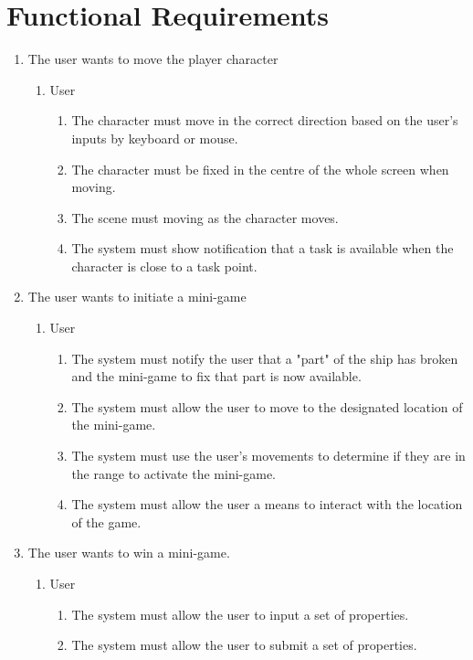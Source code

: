 \documentclass[]{article}
\begin{document}
\section{Functional Requirements}
\label{sec:functional_requirements}
\begin{enumerate}[{BE}1.]
	\item  The user wants to move the player character
	\begin{enumerate}[{VP1}.1]
		\item User
			\begin{enumerate}
				\item The character must move in the correct direction based on the user's inputs by keyboard or mouse.
				\item The character must be fixed in the centre of the whole screen when moving.
				\item The scene must moving as the character moves.
				\item The system must show notification that a task is available when the character is close to a task point.
			\end{enumerate}
	\end{enumerate}
	\item The user wants to initiate a mini-game
	\begin{enumerate}[{VP2}.1]
		\item User
			\begin{enumerate}
			    \item The system must notify the user that a "part" of the ship has broken and the mini-game to fix that part is now available.
				\item The system must allow the user to move to the designated location of the mini-game.
				\item The system must use the user's movements to determine if they are in the range to activate the mini-game.
				\item The system must allow the user a means to interact with the location of the game.
			\end{enumerate}
	\end{enumerate}
	\item The user wants to win a mini-game.
	\begin{enumerate}[{VP3}.1]
		\item User
			\begin{enumerate}
				\item The system must allow the user to input a set of properties.
				\item The system must allow the user to submit a set of properties.

\end{enumerate}
\end{enumerate}
\end{enumerate}
\end{document}
